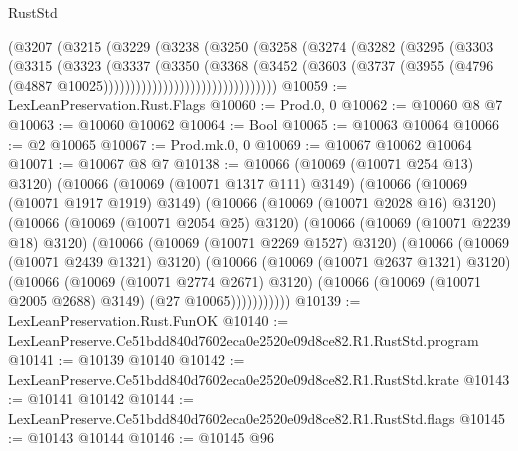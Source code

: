 \begin{lexlean}{RustStd}
\begin{coremodule}
                          (@3207
                            (@3215
                              (@3229
                                (@3238
                                  (@3250
                                    (@3258
                                      (@3274
                                        (@3282
                                          (@3295
                                            (@3303
                                              (@3315
                                                (@3323
                                                  (@3337
                                                    (@3350
                                                      (@3368
                                                        (@3452
                                                          (@3603
                                                            (@3737
                                                              (@3955
                                                                (@4796
                                                                  (@4887
                                                                    @10025))))))))))))))))))))))))))))))))
@10059 := LexLeanPreservation.Rust.Flags
@10060 := Prod.{0, 0}
@10062 := @10060 @8 @7
@10063 := @10060 @10062
@10064 := Bool
@10065 := @10063 @10064
@10066 := @2 @10065
@10067 := Prod.mk.{0, 0}
@10069 := @10067 @10062 @10064
@10071 := @10067 @8 @7
@10138 := @10066
    (@10069 (@10071 @254 @13) @3120)
    (@10066
      (@10069 (@10071 @1317 @111) @3149)
      (@10066
        (@10069 (@10071 @1917 @1919) @3149)
        (@10066
          (@10069 (@10071 @2028 @16) @3120)
          (@10066
            (@10069 (@10071 @2054 @25) @3120)
            (@10066
              (@10069 (@10071 @2239 @18) @3120)
              (@10066
                (@10069 (@10071 @2269 @1527) @3120)
                (@10066
                  (@10069 (@10071 @2439 @1321) @3120)
                  (@10066
                    (@10069 (@10071 @2637 @1321) @3120)
                    (@10066
                      (@10069 (@10071 @2774 @2671) @3120)
                      (@10066 (@10069 (@10071 @2005 @2688) @3149) (@27 @10065)))))))))))
@10139 := LexLeanPreservation.Rust.FunOK
@10140 := LexLeanPreserve.Ce51bdd840d7602eca0e2520e09d8ce82.R1.RustStd.program
@10141 := @10139 @10140
@10142 := LexLeanPreserve.Ce51bdd840d7602eca0e2520e09d8ce82.R1.RustStd.krate
@10143 := @10141 @10142
@10144 := LexLeanPreserve.Ce51bdd840d7602eca0e2520e09d8ce82.R1.RustStd.flags
@10145 := @10143 @10144
@10146 := @10145 @96

\end{coremodule}
\end{lexlean}
